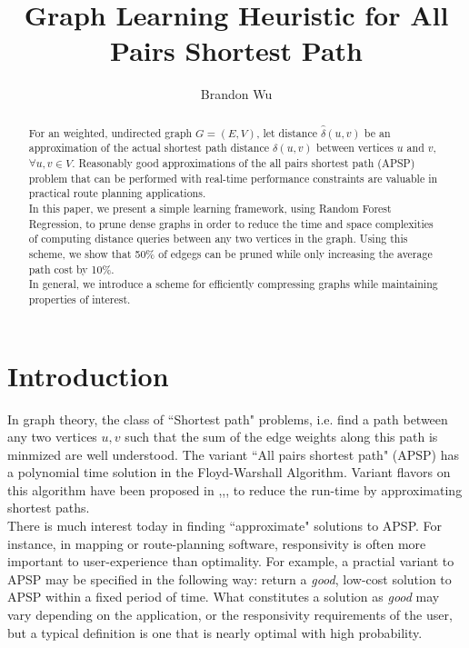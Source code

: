 \documentclass[10.5pt,journal]{IEEEtran}
\begin{document}
%
\title{Graph Learning Heuristic for All Pairs Shortest Path}
\author{Brandon Wu}

\maketitle

\begin{abstract}
For an weighted, undirected graph $G = (E,V)$, let distance $\hat{\delta}(u,v)$ be an approximation of the actual
shortest path distance $\delta(u,v)$ between vertices $u$ and $v$, $\forall u,v\in V$. Reasonably good
approximations of the all pairs shortest path (APSP) problem that can be performed with 
real-time performance constraints are valuable in practical route planning applications.\\

In this paper, we present a simple learning framework, using Random Forest Regression, to prune dense graphs
in order to reduce the time and space complexities of computing distance queries between any two vertices in
the graph. Using this scheme, we show that 50\% of edgegs can be pruned while only increasing the average
path cost by 10\%.\\

In general, we introduce a scheme for efficiently compressing graphs while maintaining properties of interest.
\end{abstract}

\section{Introduction}
In graph theory, the class of ``Shortest path" problems, i.e. find a path between any two vertices $u,v$ such
that the sum of the edge weights along this path is minmized are well understood. The variant ``All pairs
shortest path" (APSP) has a polynomial time solution in the Floyd-Warshall Algorithm.
Variant flavors on this algorithm have been proposed in 
\cite{approx1},\cite{approx2},\cite{neuralNet},\cite{astar}
to reduce the run-time by approximating shortest paths. \\

There is much interest today in finding ``approximate" solutions to APSP. For instance, in mapping or route-planning
software, responsivity is often more important to user-experience than optimality. For example,
a practial variant to APSP may be specified in the following way: return a {\it{good}}, low-cost
solution to APSP within a fixed period of time. What constitutes a solution as {\it{good}}
may vary depending on the application, or the responsivity requirements of the user, but a typical
definition is one that is nearly optimal with high probability.\\
\end{document}
